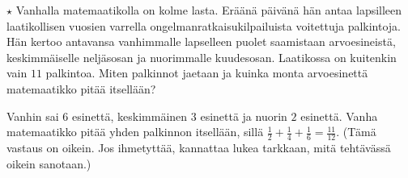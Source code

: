 \begin{tehtavasivu}
\begin{tehtava}
	$\star$ Vanhalla matemaatikolla on kolme lasta. Eräänä päivänä hän antaa lapsilleen laatikollisen vuosien varrella ongelmanratkaisukilpailuista voitettuja palkintoja. Hän kertoo antavansa vanhimmalle lapselleen puolet saamistaan arvoesineistä, keskimmäiselle neljäsosan ja nuorimmalle kuudesosan. Laatikossa on kuitenkin vain $11$ palkintoa. Miten  palkinnot jaetaan ja kuinka monta arvoesinettä matemaatikko pitää itsellään?
	\begin{vastaus}
		Vanhin sai $6$ esinettä, keskimmäinen $3$ esinettä ja nuorin $2$ esinettä. Vanha matemaatikko pitää yhden palkinnon itsellään, sillä $\frac{1}{2} + \frac{1}{4} + \frac{1}{6} = \frac{11}{12}$. (Tämä vastaus on oikein. Jos ihmetyttää, kannattaa lukea tarkkaan, mitä tehtävässä oikein sanotaan.)
	\end{vastaus}
\end{tehtava}

\end{tehtavasivu}